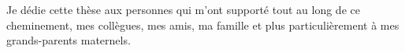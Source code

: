\begin{dedic}

Je dédie cette thèse aux personnes qui m'ont supporté tout au long de ce cheminement, mes collègues, mes amis, ma famille et plus particulièrement à mes grands-parents maternels.

\end{dedic}
